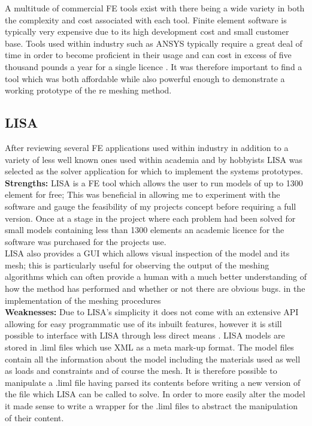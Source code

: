 \noindent
A multitude of commercial FE tools exist with there being a wide variety in both the complexity and cost associated with each tool. 
Finite element software is typically very expensive due to its high development cost and small customer base. Tools used within industry such as ANSYS typically require a great deal of time in order to become proficient in their usage and can cost in excess of five thousand pounds a year for a single licence \cite{AnsysCost}. It was therefore important to find a tool which was both affordable while also powerful enough to demonstrate a working prototype of the re meshing method.
 
\subsection{LISA}
After reviewing several FE applications used within industry in addition to a variety of less well known ones used within academia and by hobbyists LISA  was selected as the solver application for which to implement  the systems prototypes. \\ 

\noindent
\textbf{Strengths: }LISA is a FE tool which allows the user to run models of up to 1300 element for free; This was beneficial in allowing me to experiment with the software and gauge the feasibility of my projects concept before requiring a full version. Once at a stage in the project where each problem had been solved for small models containing less than 1300 elements an academic licence for the software was purchased for the projects use. \\

\noindent
LISA also provides a GUI which allows visual inspection of the model and its mesh; this is particularly useful for observing the output of the meshing algorithms which can often provide a human with a much better understanding of how the method has performed and whether or not there are obvious bugs. in the implementation of the meshing procedures \\ 

\noindent
\textbf{Weaknesses: } Due to LISA’s simplicity it does not come with an extensive API allowing for easy programmatic use of its inbuilt features, however it is still possible to interface with LISA through less direct means \cite{LISAManual}. LISA models are stored in .liml files which use XML as a meta mark-up format. The model files contain all the information about the model including the materials used as well as loads and constraints and of course the mesh. It is therefore possible to manipulate a .liml file having parsed its contents before writing a new version of the file which LISA can be called to solve. In order to more easily alter the model it made sense to write a wrapper  for the .liml files to abstract the manipulation of their content. \\ 


